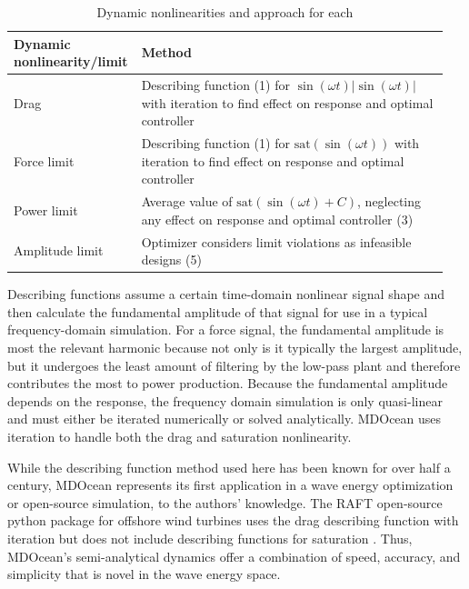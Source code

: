 \begin{table}
    \centering
    \begin{tabular}{>{\raggedright\arraybackslash}p{0.25\linewidth}>{\raggedright\arraybackslash}p{0.7\linewidth}}
         \textbf{Dynamic nonlinearity/limit}& \parbox{\linewidth}{\centering\textbf{Method}}\\ \hline
         Drag& Describing function (1) for $\sin(\omega t)|\sin(\omega t)|$ with iteration to find effect on response and optimal controller\\
         Force limit& Describing function (1) for $\text{sat}(\sin(\omega t))$ with iteration to find effect on response and optimal controller\\
         Power limit& Average value of $\text{sat}(\sin(\omega t)+C)$, neglecting any effect on response and optimal controller (3)\\
  Amplitude limit&Optimizer considers limit violations as infeasible designs (5)\\\end{tabular}
    \caption{Dynamic nonlinearities and approach for each}
    \label{tab:nonlinearities}
\end{table}

Describing functions assume a certain time-domain nonlinear signal shape and then calculate the fundamental amplitude of that signal for use in a typical frequency-domain simulation.
For a force signal, the fundamental amplitude is most the relevant harmonic because not only is it typically the largest amplitude, but it undergoes the least amount of filtering by the low-pass plant and therefore contributes the most to power production.
Because the fundamental amplitude depends on the response, the frequency domain simulation is only quasi-linear and must either be iterated numerically or solved analytically.
MDOcean uses iteration to handle both the drag and saturation nonlinearity. %

While the describing function method used here has been known for over half a century, MDOcean represents its first application in a wave energy optimization or open-source simulation, to the authors' knowledge.
The RAFT open-source python package for offshore wind turbines uses the drag describing function with iteration but does not include describing functions for saturation \cite{hall_open-source_2022}.
Thus, MDOcean's semi-analytical dynamics offer a combination of speed, accuracy, and simplicity that is novel in the wave energy space.

